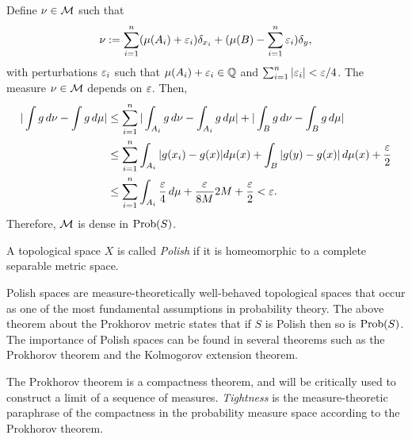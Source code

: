 \documentclass[a4paper]{article}
\begin{document}
\begin{pf}
Define $\nu\in\mathcal{M}$ such that
\[\nu:=\sum_{i=1}^n(\mu(A_i)+\varepsilon_i)\delta_{x_i}+(\mu(B)-\sum_{i=1}^n\varepsilon_i)\delta_y,\]
with perturbations $\varepsilon_i$ such that $\mu(A_i)+\varepsilon_i\in\mathbb{Q}$ and $\sum_{i=1}^n|\varepsilon_i|<\varepsilon/4$.
The measure $\nu\in\mathcal{M}$ depends on $\varepsilon$.
Then,
\begin{align*}
|\int g\,d\nu-\int g\,d\mu|
&\le\sum_{i=1}^n|\int_{A_i}g\,d\nu-\int_{A_i}g\,d\mu|+|\int_Bg\,d\nu-\int_Bg\,d\mu|\\
&\le\sum_{i=1}^n\int_{A_i}|g(x_i)-g(x)|d\mu(x)+\int_B|g(y)-g(x)|\,d\mu(x)+\frac{\varepsilon}2\\
&\le\sum_{i=1}^n\int_{A_i}\frac{\varepsilon}4\,d\mu+\frac{\varepsilon}{8M}2M+\frac{\varepsilon}2<\varepsilon.
\end{align*}
Therefore, $\mathcal{M}$ is dense in $\operatorname{Prob}(S)$.
\end{pf}

\begin{defn}
A topological space $X$ is called \emph{Polish} if it is homeomorphic to a complete separable metric space.
\end{defn}

Polish spaces are measure-theoretically well-behaved topological spaces that occur as one of the most fundamental assumptions in probability theory.
The above theorem about the Prokhorov metric states that if $S$ is Polish then so is $\operatorname{Prob}(S)$.
The importance of Polish spaces can be found in several theorems such as the Prokhorov theorem and the Kolmogorov extension theorem.

The Prokhorov theorem is a compactness theorem, and will be critically used to construct a limit of a sequence of measures.
\emph{Tightness} is the measure-theoretic paraphrase of the compactness in the probability measure space according to the Prokhorov theorem.
\end{document}

